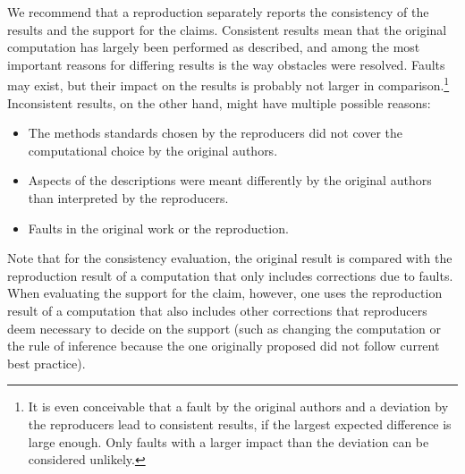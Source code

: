 \documentclass[authordate, meta]{jote-new-article}
\begin{document}
	We recommend that a reproduction separately reports the consistency of the results and the support for the claims. Consistent results mean that the original computation has largely been performed as described, and among the most important reasons for differing results is the way obstacles were resolved. Faults may exist, but their impact on the results is probably not larger in comparison.\footnote{ It is even conceivable that a fault by the original authors and a deviation by the reproducers lead to consistent results, if the largest expected difference is large enough. Only faults with a larger impact than the deviation can be considered unlikely.} Inconsistent results, on the other hand, might have multiple possible reasons:
	\begin{itemize}


		\item The methods standards chosen by the reproducers did not cover the computational choice by the original authors.



		\item
		Aspects of the descriptions were meant differently by the original authors than interpreted by the reproducers.



		\item Faults in the original work or the reproduction.


	\end{itemize}

	Note that for the consistency evaluation, the original result is compared with the reproduction result of a computation that only includes corrections due to faults. When evaluating the support for the claim, however, one uses the reproduction result of a computation that also includes other corrections that reproducers deem necessary to decide on the support (such as changing the computation or the rule of inference because the one originally proposed did not follow current best practice).
\end{document}
